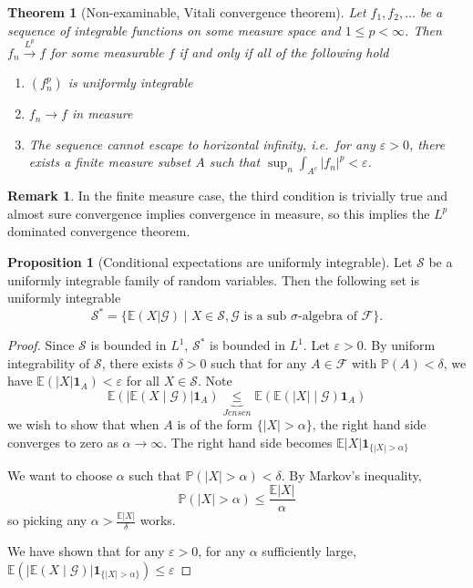 \documentclass[parskip=full]{article}
\newtheorem{theorem}{Theorem}[section]
\theoremstyle{definition}
\newtheorem{proposition}{Proposition}[section]
\newtheorem*{remark}{Remark}
\newcommand{\Pbb}{\mathbb{P}}
\newcommand{\1}{\mathbbm{1}}
\newcommand{\E}{\mathbb{E}}
\begin{document}
\begin{theorem}[Non-examinable, Vitali convergence theorem]
  Let $f_1, f_2, \ldots$ be a sequence of integrable functions on some measure space and $1 \leq p < \infty$. Then $f_n \xrightarrow{L^p} f$ for some measurable $f$ if and only if all of the following hold
  \begin{enumerate}
    \item $(f_n^p)$ is uniformly integrable
    \item $f_n \to f$ in measure
    \item The sequence cannot escape to horizontal infinity, i.e.\ for any $\varepsilon > 0$, there exists a finite measure subset $A$ such that $\sup_n \int_{A^c} |f_n|^p < \varepsilon$.
  \end{enumerate}
\end{theorem}

\begin{remark}
  In the finite measure case, the third condition is trivially true and almost sure convergence implies convergence in measure, so this implies the $L^p$ dominated convergence theorem.
\end{remark}

\begin{proposition}[Conditional expectations are uniformly integrable] \label{Conditional expectations are uniformly integrable}
  Let $\mathcal{S}$ be a uniformly integrable family of random variables. Then the following set is uniformly integrable
  \[
    \mathcal{S}^* = \{\E(X|\mathcal{G}) \mid X \in \mathcal{S},\mathcal{G} \text{ is a sub $\sigma$-algebra of } \mathcal{F}\}.
  \]
\end{proposition}

\begin{proof}
  Since $\mathcal{S}$ is bounded in $L^1$, $\mathcal{S}^*$ is bounded in $L^1$. Let $\varepsilon > 0$. By uniform integrability of $\mathcal{S}$, there exists $\delta > 0$ such that for any $A \in \mathcal{F}$ with $\Pbb(A) < \delta$, we have $\E(|X| \mathbf{1}_A) < \varepsilon$ for all $X \in \mathcal{S}$. Note
  \[
    \E(|\E(X \mid \mathcal{G})|\mathbf{1}_A) \underbrace{\leq}_{Jensen} \E(\E (|X| \mid \mathcal{G})\mathbf{1}_A)
  \]
  we wish to show that when $A$ is of the form $\{|X| > \alpha\}$, the right hand side converges to zero as $\alpha \to \infty$. The right hand side becomes
$
    \E|X| \mathbf{1}_{\{|X| > \alpha\}}
$
  
  We want to choose $\alpha$ such that $\Pbb(|X| > \alpha) < \delta$. By Markov's inequality, 
  \[
    \Pbb(|X| > \alpha) \leq \frac{\E|X|}{\alpha}
  \]
  so picking any $\alpha > \frac{\E|X|}{\delta}$ works.

  We have shown that for any $\varepsilon > 0$, for any $\alpha$ sufficiently large, $\E(\left|\E(X \mid \mathcal{G})\right|\mathbf{1}_{\{|X|>\alpha\}}) \leq \varepsilon$
\end{proof}
\end{document}
